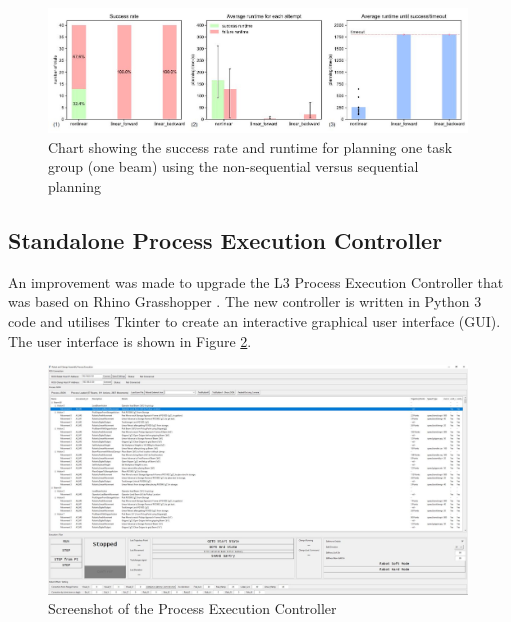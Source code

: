 \begin{figure}[!h]
    \centering
    \includegraphics[width=0.99\textwidth]{images/6a/img65.jpg}
    \caption{Chart showing the success rate and runtime for planning one task group (one beam) using the non-sequential versus sequential planning}
    \label{fig:success-rate-and-runtime}
\end{figure}


\FloatBarrier

\subsection{Standalone Process Execution Controller}
\label{subsection:exploration-3-standalone-process-execution-controller}

An improvement was made to upgrade the L3 Process Execution Controller that was based on Rhino Grasshopper . The new controller is written in Python 3 code and utilises Tkinter to create an interactive graphical user interface (GUI). The user interface is shown in Figure \ref{fig:process-execution-controller}.

\begin{figure}[!h]
    \centering
    \includegraphics[width=0.99\textwidth]{images/6a/img66.jpg}
    \caption{Screenshot of the Process Execution Controller}
    \label{fig:process-execution-controller}
\end{figure}


